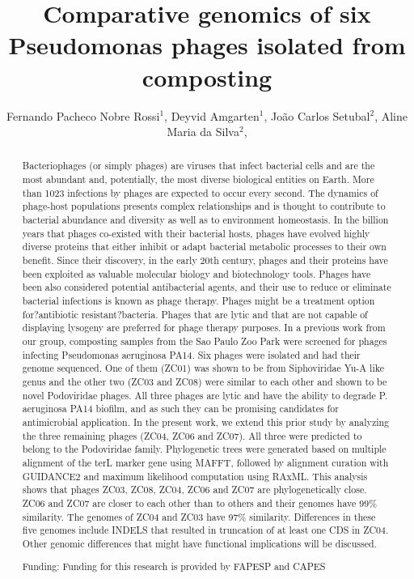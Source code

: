 \documentclass[twoside]{article}
\title{\vspace{-15mm}\fontsize{24pt}{10pt}\selectfont\textbf{ Comparative genomics of six Pseudomonas phages isolated from composting }} %
\author{ Fernando Pacheco Nobre Rossi$^{1}$, Deyvid Amgarten$^{1}$, João Carlos Setubal$^{2}$, Aline Maria da Silva$^{2}$, }
\affil{ 1 USP - Departamento de Quimica

2 USP

 }
\date{}
\begin{document}
  
  
  \maketitle %
  
  
  \thispagestyle{fancy} %
  
  
  \begin{abstract}
  Bacteriophages (or simply phages) are viruses that infect bacterial cells and are the most abundant and, potentially, the most diverse biological entities on Earth. More than 1023 infections by phages are expected to occur every second. The dynamics of phage-host populations presents complex relationships and is thought to contribute to bacterial abundance and diversity as well as to environment homeostasis. In the billion years that phages co-existed with their bacterial hosts, phages have evolved highly diverse proteins that either inhibit or adapt bacterial metabolic processes to their own benefit. Since their discovery, in the early 20th century, phages and their proteins have been exploited as valuable molecular biology and biotechnology tools. Phages have been also considered potential antibacterial agents, and their use to reduce or eliminate bacterial infections is known as phage therapy. Phages might be a treatment option for?antibiotic resistant?bacteria. Phages that are lytic and that are not capable of displaying lysogeny are preferred for phage therapy purposes. In a previous work from our group, composting samples from the Sao Paulo Zoo Park were screened for phages infecting Pseudomonas aeruginosa PA14. Six phages were isolated and had their genome sequenced. One of them (ZC01) was shown to be from Siphoviridae Yu-A like genus and the other two (ZC03 and ZC08) were similar to each other and shown to be novel Podoviridae phages. All three phages are lytic and have the ability to degrade P. aeruginosa PA14 biofilm, and as such they can be promising candidates for antimicrobial application. In the present work, we extend this prior study by analyzing the three remaining phages (ZC04, ZC06 and ZC07). All three were predicted to belong to the Podoviridae family. Phylogenetic trees were generated based on multiple alignment of the terL marker gene using MAFFT, followed by alignment curation with GUIDANCE2 and maximum likelihood computation using RAxML. This analysis shows that phages ZC03, ZC08, ZC04, ZC06 and ZC07 are phylogenetically close. ZC06 and ZC07 are closer to each other than to others and their genomes have 99\% similarity. The genomes of ZC04 and ZC03 have 97\% similarity. Differences in these five genomes include INDELS that resulted in truncation of at least one CDS in ZC04. Other genomic differences that might have functional implications will be discussed.
  
  Funding: Funding for this research is provided by FAPESP and CAPES \\ 
  \end{abstract}
  
\end{document}
